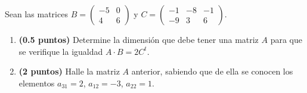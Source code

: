 
Sean las matrices $B=\begin{pmatrix}-5&0\\4&6\end{pmatrix}$ y $C=\begin{pmatrix}-1&-8&-1\\-9&3&6\end{pmatrix}$.
\begin{enumerate}[label=\alph*)]
\item \textbf{(0.5 puntos)} Determine la dimensión que debe tener una matriz $A$ para que se verifique la igualdad $A\cdot B=2C^t$.
\item \textbf{(2 puntos)} Halle la matriz $A$ anterior, sabiendo que de ella se conocen los elementos $a_{31}=2$, $a_{12}=-3$, $a_{22}=1$.
\end{enumerate}
